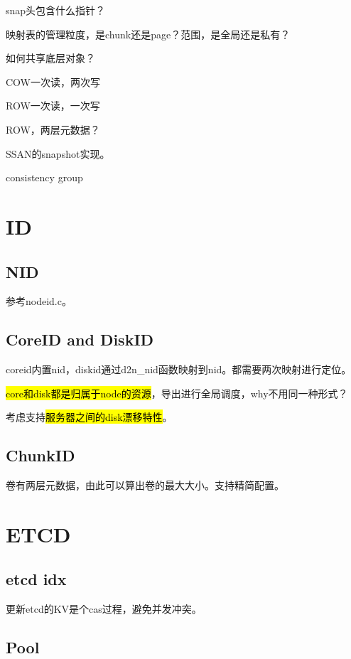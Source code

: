 snap头包含什么指针？

映射表的管理粒度，是chunk还是page？范围，是全局还是私有？

如何共享底层对象？

COW一次读，两次写

ROW一次读，一次写

ROW，两层元数据？

\hrulefill

SSAN的snapshot实现。

consistency group

\section{ID}

\subsection{NID}

参考nodeid.c。

\subsection{CoreID and DiskID}

coreid内置nid，diskid通过d2n\_nid函数映射到nid。都需要两次映射进行定位。

\hl{core和disk都是归属于node的资源}，导出进行全局调度，why不用同一种形式？

考虑支持\hl{服务器之间的disk漂移特性}。

\subsection{ChunkID}


卷有两层元数据，由此可以算出卷的最大大小。支持精简配置。

\section{ETCD}

\subsection{etcd idx}

更新etcd的KV是个cas过程，避免并发冲突。

\subsection{Pool}

